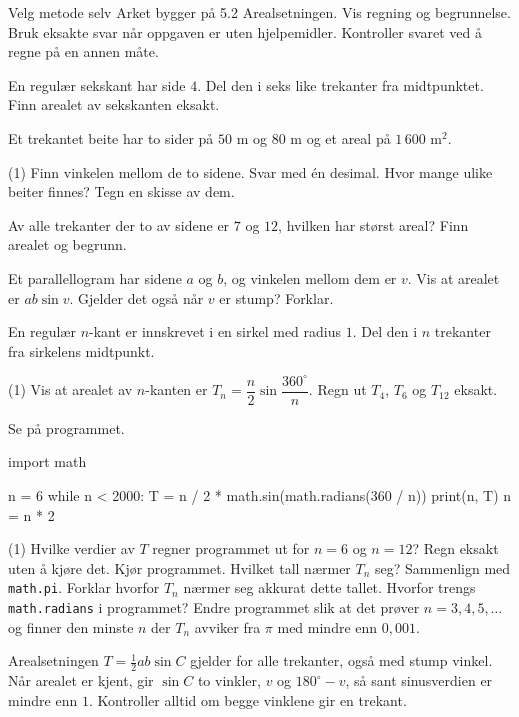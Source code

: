 
\begin{infoboks}{Velg metode selv}
Arket bygger på 5.2 Arealsetningen. Vis regning og begrunnelse. Bruk eksakte svar når oppgaven er uten hjelpemidler.
Kontroller svaret ved å regne på en annen måte.
\end{infoboks}


En regulær sekskant har side $4$. Del den i seks like trekanter fra midtpunktet. Finn arealet av sekskanten eksakt.

Et trekantet beite har to sider på $50$ m og $80$ m og et areal på $1\,600$ m$^2$.
\begin{tasks}(1)
  \task Finn vinkelen mellom de to sidene. Svar med én desimal.
  \task Hvor mange ulike beiter finnes? Tegn en skisse av dem.
\end{tasks}

Av alle trekanter der to av sidene er $7$ og $12$, hvilken har størst areal? Finn arealet og begrunn.


Et parallellogram har sidene $a$ og $b$, og vinkelen mellom dem er $v$. Vis at arealet er $ab\sin v$.
Gjelder det også når $v$ er stump? Forklar.

En regulær $n$-kant er innskrevet i en sirkel med radius $1$. Del den i $n$ trekanter fra sirkelens midtpunkt.
\begin{tasks}(1)
  \task Vis at arealet av $n$-kanten er $T_n = \dfrac{n}{2}\sin\dfrac{360^\circ}{n}$.
  \task Regn ut $T_4$, $T_6$ og $T_{12}$ eksakt.
\end{tasks}

Se på programmet.
\begin{kode}
import math

n = 6
while n < 2000:
    T = n / 2 * math.sin(math.radians(360 / n))
    print(n, T)
    n = n * 2
\end{kode}
\begin{tasks}(1)
  \task Hvilke verdier av $T$ regner programmet ut for $n = 6$ og $n = 12$? Regn eksakt uten å kjøre det.
  \task Kjør programmet. Hvilket tall nærmer $T_n$ seg? Sammenlign med \lstinline[style=laereverk,numbers=none,frame=none]|math.pi|.
  \task Forklar hvorfor $T_n$ nærmer seg akkurat dette tallet.
  \task Hvorfor trengs \lstinline[style=laereverk,numbers=none,frame=none]|math.radians| i programmet?
  \task Endre programmet slik at det prøver $n = 3, 4, 5, \ldots$ og finner den minste $n$ der $T_n$ avviker fra $\pi$ med mindre enn $0{,}001$.
\end{tasks}

\begin{oppsummering}
Arealsetningen $T = \frac12 ab\sin C$ gjelder for alle trekanter, også med stump vinkel.
Når arealet er kjent, gir $\sin C$ to vinkler, $v$ og $180^\circ - v$, så sant sinusverdien er mindre enn $1$.
Kontroller alltid om begge vinklene gir en trekant.
\end{oppsummering}
